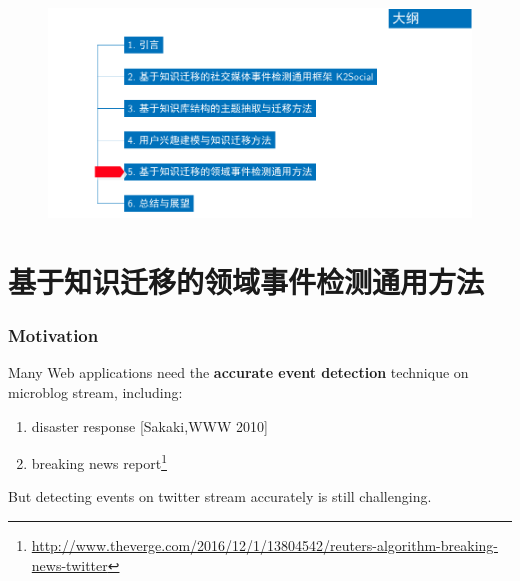 \begin{frame}[plain]
\vspace*{-9.5mm}
\begin{figure}
	\hspace*{-4.2mm}
    \includegraphics[width=1.0\paperwidth]{img/contents5_output.pdf}
\end{figure}

\end{frame}

\section{基于知识迁移的领域事件检测通用方法}
\begin{frame}
\frametitle{Motivation}

Many Web applications need the \textbf{accurate event detection} technique on microblog stream, including:
\begin{enumerate}
	\item disaster response [Sakaki,WWW 2010]
	\item breaking news report\footnote{\url{http://www.theverge.com/2016/12/1/13804542/reuters-algorithm-breaking-news-twitter}}
\end{enumerate}	
\vfill

But detecting events on twitter stream accurately is still challenging.
\end{frame}

